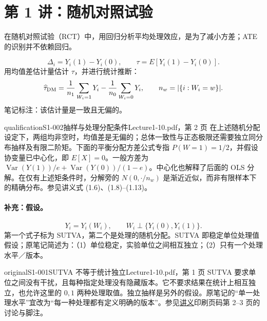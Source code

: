 \section{第 1 讲：随机对照试验}
在随机对照试验（RCT）中，用回归分析平均处理效应，是为了减小方差；ATE 的识别并不依赖回归。

\[
\Delta_i=Y_i(1)-Y_i(0),\qquad \tau=E[Y_i(1)-Y_i(0)].
\]
用均值差估计量估计 $\tau$，并进行统计推断：
\[
\widehat\tau_{\rm DM}=\frac1{n_1}\sum_{W_i=1}Y_i-\frac1{n_0}\sum_{W_i=0}Y_i,
\qquad n_w=|\{i:W_i=w\}|.
\]
笔记标注：该估计量是一致且无偏的。

\begin{reviewnote}{qualification}{S1-002}{抽样与处理分配条件}{Lecture1-10.pdf，第 2 页}
在上述随机分配设定下，两组均非空时，均值差是无偏的；总体一致性与正态极限还需要独立同分布抽样及有限二阶矩。下面的平衡分配方差公式专指 $P(W=1)=1/2$，并假设协变量已中心化，即 $E[X]=0$。一般方差为 $\operatorname{Var}(Y(1))/e+\operatorname{Var}(Y(0))/(1-e)$。中心化也解释了后面的 OLS 分解。在仅有上述矩条件时，分解旁的 $N(0,\cdot/n_w)$ 是渐近近似，而非有限样本下的精确分布。参见讲义式 (1.6)、(1.8)--(1.13)。
\end{reviewnote}

\paragraph{补充：假设。}
\[
Y_i=Y_i(W_i),\qquad W_i\perp\{Y_i(0),Y_i(1)\}.
\]
第一个式子标为 SUTVA，第二个是处理的随机分配。SUTVA 即稳定单位处理值假设；原笔记简述为：（1）单位稳定，实验单位之间相互独立；（2）只有一个处理水平／版本。

\begin{reviewnote}{original}{S1-001}{SUTVA 不等于统计独立}{Lecture1-10.pdf，第 1 页}
SUTVA 要求单位之间没有干扰，且每种指定处理没有隐藏版本。它不要求结果在统计上相互独立，也允许这里的 $0,1$ 两种处理取值。独立抽样是另外的假设。原笔记的“单一处理水平”宜改为“每一种处理都有定义明确的版本”。参见\href{https://web.stanford.edu/~swager/stats361.pdf}{讲义}印刷页码第 2--3 页的讨论与脚注。
\end{reviewnote}

